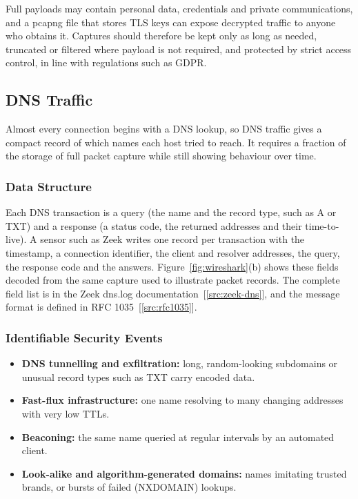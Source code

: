 Full payloads may contain personal data, credentials and private communications, and a pcapng file that stores TLS keys can expose decrypted traffic to anyone who obtains it. Captures should therefore be kept only as long as needed, truncated or filtered where payload is not required, and protected by strict access control, in line with regulations such as GDPR.

\subsection{DNS Traffic}
\label{sec:dns}

Almost every connection begins with a DNS lookup, so DNS traffic gives a compact record of which names each host tried to reach. It requires a fraction of the storage of full packet capture while still showing behaviour over time.

\subsubsection{Data Structure}

Each DNS transaction is a query (the name and the record type, such as A or TXT) and a response (a status code, the returned addresses and their time-to-live). A sensor such as Zeek writes one record per transaction with the timestamp, a connection identifier, the client and resolver addresses, the query, the response code and the answers. Figure~\ref{fig:wireshark}(b) shows these fields decoded from the same capture used to illustrate packet records. The complete field list is in the Zeek dns.log documentation~[\ref{src:zeek-dns}], and the message format is defined in RFC 1035~[\ref{src:rfc1035}].

\subsubsection{Identifiable Security Events}

\begin{itemize}
  \item \textbf{DNS tunnelling and exfiltration:} long, random-looking subdomains or unusual record types such as TXT carry encoded data.
  \item \textbf{Fast-flux infrastructure:} one name resolving to many changing addresses with very low TTLs.
  \item \textbf{Beaconing:} the same name queried at regular intervals by an automated client.
  \item \textbf{Look-alike and algorithm-generated domains:} names imitating trusted brands, or bursts of failed (NXDOMAIN) lookups.
\end{itemize}

